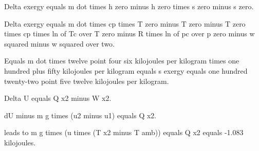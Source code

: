 Delta exergy equals m dot times h zero minus h zero times s zero minus s zero.

Delta exergy equals m dot times cp times T zero minus T zero minus T zero times cp times ln of Tc over T zero minus R times ln of pc over p zero minus w squared minus w squared over two.

Equals m dot times twelve point four six kilojoules per kilogram times one hundred plus fifty kilojoules per kilogram equals s exergy equals one hundred twenty-two point five twelve kilojoules per kilogram.

Delta U equals Q x2 minus W x2.

dU minus m g times (u2 minus u1) equals Q x2.

leads to m g times (u times (T x2 minus T amb)) equals Q x2 equals -1.083 kilojoules.